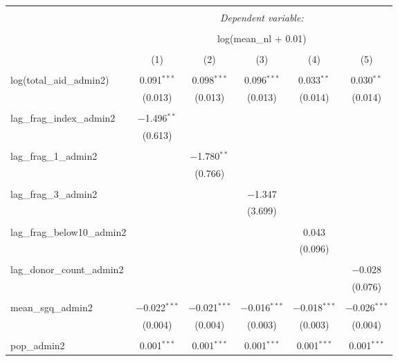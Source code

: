 
\begin{table}[!htbp] \centering 
  \caption{} 
  \label{} 
\begin{tabular}{@{\extracolsep{5pt}}lccccc} 
\\[-1.8ex]\hline 
\hline \\[-1.8ex] 
 & \multicolumn{5}{c}{\textit{Dependent variable:}} \\ 
\cline{2-6} 
\\[-1.8ex] & \multicolumn{5}{c}{log(mean\_nl + 0.01)} \\ 
\\[-1.8ex] & (1) & (2) & (3) & (4) & (5)\\ 
\hline \\[-1.8ex] 
 log(total\_aid\_admin2) & 0.091$^{***}$ & 0.098$^{***}$ & 0.096$^{***}$ & 0.033$^{**}$ & 0.030$^{**}$ \\ 
  & (0.013) & (0.013) & (0.013) & (0.014) & (0.014) \\ 
  & & & & & \\ 
 lag\_frag\_index\_admin2 & $-$1.496$^{**}$ &  &  &  &  \\ 
  & (0.613) &  &  &  &  \\ 
  & & & & & \\ 
 lag\_frag\_1\_admin2 &  & $-$1.780$^{**}$ &  &  &  \\ 
  &  & (0.766) &  &  &  \\ 
  & & & & & \\ 
 lag\_frag\_3\_admin2 &  &  & $-$1.347 &  &  \\ 
  &  &  & (3.699) &  &  \\ 
  & & & & & \\ 
 lag\_frag\_below10\_admin2 &  &  &  & 0.043 &  \\ 
  &  &  &  & (0.096) &  \\ 
  & & & & & \\ 
 lag\_donor\_count\_admin2 &  &  &  &  & $-$0.028 \\ 
  &  &  &  &  & (0.076) \\ 
  & & & & & \\ 
 mean\_sgq\_admin2 & $-$0.022$^{***}$ & $-$0.021$^{***}$ & $-$0.016$^{***}$ & $-$0.018$^{***}$ & $-$0.026$^{***}$ \\ 
  & (0.004) & (0.004) & (0.003) & (0.003) & (0.004) \\ 
  & & & & & \\ 
 pop\_admin2 & 0.001$^{***}$ & 0.001$^{***}$ & 0.001$^{***}$ & 0.001$^{***}$ & 0.001$^{***}$ \\ 

\end{tabular}
\end{table}
